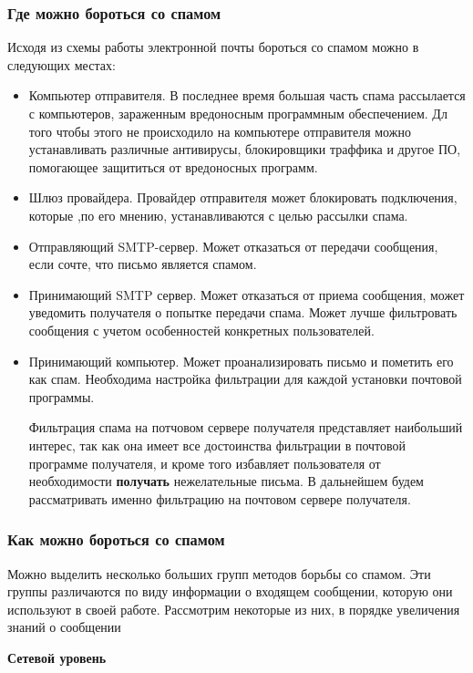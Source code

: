 \subsubsection{Где можно бороться со спамом}
Исходя из схемы работы электронной почты бороться со спамом можно в следующих местах:
\begin{itemize}
\item Компьютер отправителя. В последнее время большая часть спама рассылается с компьютеров, зараженным вредоносным программным обеспечением. Дл того чтобы этого не происходило на компьютере отправителя можно устанавливать различные антивирусы, блокировщики  траффика и другое ПО, помогающее защититься от вредоносных программ.
\item Шлюз провайдера. Провайдер отправителя может блокировать подключения, которые ,по его мнению, устанавливаются с целью рассылки спама.
\item Отправляющий SMTP-сервер. Может отказаться от передачи сообщения, если сочте, что письмо является спамом.
\item Принимающий SMTP сервер. Может отказаться от приема сообщения, может уведомить получателя о попытке передачи спама. Может лучше фильтровать сообщения с учетом особенностей конкретных пользователей.
\item Принимающий компьютер. Может проанализировать письмо и пометить его как спам. Необходима настройка фильтрации для каждой установки почтовой программы.

Фильтрация спама на потчовом сервере получателя представляет наибольший интерес, так как она имеет все достоинства фильтрации в почтовой программе получателя, и кроме того избавляет пользователя от необходимости \textbf{получать} нежелательные письма. В дальнейшем будем рассматривать именно фильтрацию на почтовом сервере получателя.
\end{itemize}

\subsubsection{Как можно бороться со спамом}
Можно выделить несколько больших групп методов борьбы со спамом. Эти группы различаются по виду информации о входящем сообщении, которую они используют в своей работе. Рассмотрим некоторые из них, в порядке увеличения знаний о сообщении

\textbf{Сетевой уровень}

